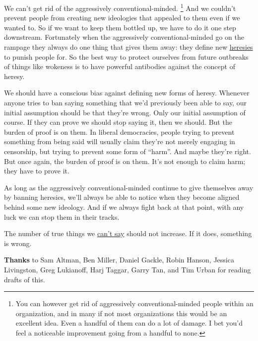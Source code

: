 We can't get rid of the aggressively conventional-minded.
\footnote{You can however get rid of aggressively conventional-minded
people within an organization, and in many if not most organizations
this would be an excellent idea. Even a handful of them can do a lot of
damage. I bet you'd feel a noticeable improvement going from a handful
to none.} And we couldn't prevent people from creating
new ideologies that appealed to them even if we wanted to. So if we want
to keep them bottled up, we have to do it one step downstream.
Fortunately when the aggressively conventional-minded go on the rampage
they always do one thing that gives them away: they define new
\href{heresy.html}{heresies} to punish people for. So the best way to
protect ourselves from future outbreaks of things like wokeness is to
have powerful antibodies against the concept of heresy.

We should have a conscious bias against defining new forms of heresy.
Whenever anyone tries to ban saying something that we'd previously been
able to say, our initial assumption should be that they're wrong. Only
our initial assumption of course. If they can prove we should stop
saying it, then we should. But the burden of proof is on them. In
liberal democracies, people trying to prevent something from being said
will usually claim they're not merely engaging in censorship, but trying
to prevent some form of ``harm''. And maybe they're right. But once
again, the burden of proof is on them. It's not enough to claim harm;
they have to prove it.

As long as the aggressively conventional-minded continue to give
themselves away by banning heresies, we'll always be able to notice when
they become aligned behind some new ideology. And if we always fight
back at that point, with any luck we can stop them in their tracks.

The number of true things we \href{say.html}{can't say} should not
increase. If it does, something is wrong.


\textbf{Thanks} to Sam Altman, Ben Miller, Daniel Gackle, Robin Hanson,
Jessica Livingston, Greg Lukianoff, Harj Taggar, Garry Tan, and Tim
Urban for reading drafts of this.